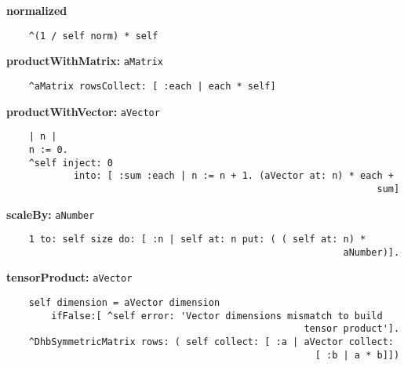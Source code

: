 {\bf normalized}
\begin{verbatim}
    ^(1 / self norm) * self

\end{verbatim}
{\bf productWithMatrix:} {\tt aMatrix}
\begin{verbatim}
    ^aMatrix rowsCollect: [ :each | each * self]

\end{verbatim}
{\bf productWithVector:} {\tt aVector}
\begin{verbatim}
    | n |
    n := 0.
    ^self inject: 0
            into: [ :sum :each | n := n + 1. (aVector at: n) * each + 
                                                                  sum]

\end{verbatim}
{\bf scaleBy:} {\tt aNumber}
\begin{verbatim}
    1 to: self size do: [ :n | self at: n put: ( ( self at: n) * 
                                                            aNumber)].

\end{verbatim}
{\bf tensorProduct:} {\tt aVector}
\begin{verbatim}
    self dimension = aVector dimension
        ifFalse:[ ^self error: 'Vector dimensions mismatch to build 
                                                     tensor product'].
    ^DhbSymmetricMatrix rows: ( self collect: [ :a | aVector collect: 
                                                       [ :b | a * b]])

\end{verbatim}

